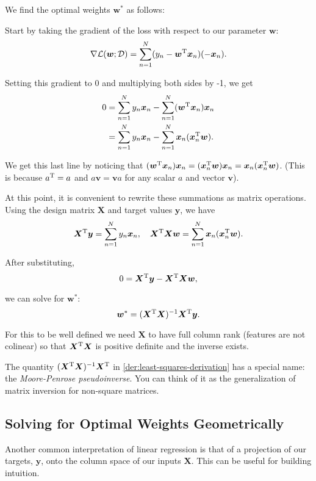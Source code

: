 \begin{derivation}
    \label{der:least-squares-derivation}
    We find the optimal weights $\bm{w}^*$ as follows:

    Start by taking the gradient of the loss with respect to our parameter $\bm{w}$: $$\nabla \mathcal{L}(\bm{w}; \mathcal D) = \sum_{n=1}^{N} (y_n - \bm{w}^{\mathrm T} \bm{x}_n)(-\bm{x}_n).$$

    Setting this gradient to 0 and multiplying both sides by -1, we get 
    \begin{align*}
        0 &= \sum_{n=1}^{N} y_n \bm{x}_n - \sum_{n=1}^N (\bm{w}^{\mathrm T}\bm{x}_n)\bm{x}_n \\
        &= \sum_{n=1}^{N} y_n \bm{x}_n - \sum_{n=1}^N \bm{x}_n(\bm{x}_n^{\mathrm T}\bm{w}).
    \end{align*}
    
    We get this last line by noticing that $(\bm{w}^{\mathrm T}\bm{x}_n)\bm{x}_n = (\bm{x}_n^{\mathrm T}\bm{w})\bm{x}_n = \bm{x}_n(\bm{x}_n^{\mathrm T}\bm{w})$. (This is because $a^{\mathrm T}=a$ and $a\bm{v}=\bm{v}a$ for any scalar $a$ and vector $\bm{v}$).

    At this point, it is convenient to rewrite these summations as matrix operations. Using the design matrix $\bm{X}$ and target values $\bm{y}$, we have
    \begin{align*}
    \bm{X}^{\mathrm T}\bm{y}=\sum_{n=1}^N y_n \bm{x}_n, \quad
    \bm{X}^{\mathrm T}\bm{X}\bm{w}=\sum_{n=1}^N\bm{x}_n(\bm{x}_n^{\mathrm T}\bm{w}).
    \end{align*}

    After substituting, $$0 = \bm{X}^{\mathrm T}\bm{y} - \bm{X}^{\mathrm T}\bm{X}\bm{w},$$

    we can solve for $\bm{w}^*$:
    \begin{equation}
        \label{eq:least-squares-solved-for-w}
        \bm{w}^* = (\bm{X}^{\mathrm T} \bm{X})^{-1} \bm{X}^{\mathrm T} \bm{y}.
    \end{equation}

    For this to be well defined we need $\bm{X}$ to have full column rank (features are not colinear) so that $\bm{X}^{\mathrm T} \bm{X}$ is positive definite and the inverse exists.
\end{derivation}

The quantity $(\bm{X}^{\mathrm T}\bm{X})^{-1}\bm{X}^{\mathrm T}$ in \autoref{der:least-squares-derivation} has a special name: the \emph{Moore-Penrose pseudoinverse}. You can think of it as the generalization of matrix inversion for non-square matrices.

\subsection{Solving for Optimal Weights Geometrically}
Another common interpretation of linear regression is that of a projection of our targets, $\bm{y}$, onto the column space of our inputs $\bm{X}$. This can be useful for building intuition.

